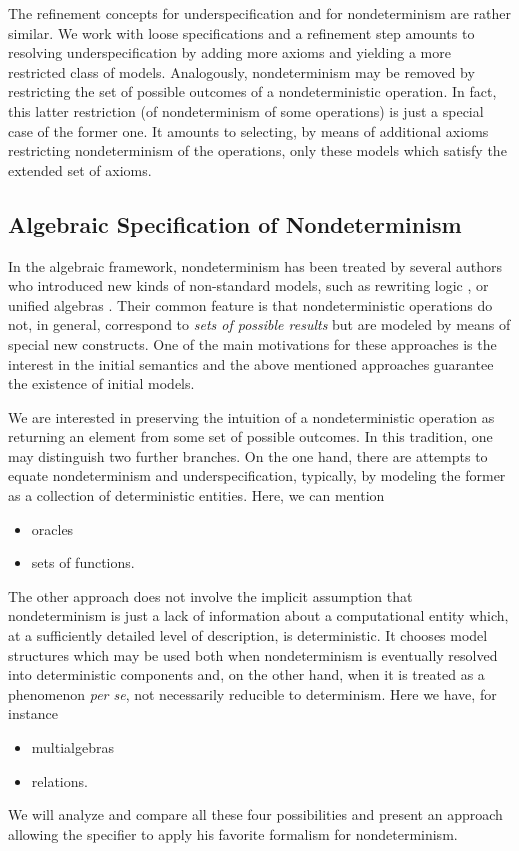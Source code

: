 The refinement concepts for underspecification and for nondeterminism are rather similar.
We work with loose specifications and a refinement step amounts to resolving underspecification
by adding more axioms and yielding a more restricted class of models. Analogously, nondeterminism may be removed by restricting the set of possible outcomes of a nondeterministic operation. In fact, this latter restriction (of nondeterminism of some operations) is just a special case of the former one. It amounts to selecting, by means of additional axioms restricting nondeterminism of the operations, only these models which satisfy the extended set of axioms. 

\subsection{Algebraic Specification of Nondeterminism} In the algebraic framework, nondeterminism has been treated by several authors
who introduced
new kinds of non-standard models, such as rewriting logic \cite{Mes}, or unified algebras \cite{Mos}. Their common feature is that nondeterministic operations do not, in general, correspond to {\em sets of possible results}
but are modeled by means of special new constructs. One of the main motivations for these approaches is the interest in the initial semantics and the above mentioned approaches guarantee the existence of initial models. 

We are interested in preserving the intuition of a nondeterministic operation as returning an element from some set of possible outcomes. In this tradition, one may distinguish
two further branches. On the one hand, there are attempts to equate nondeterminism and
underspecification, typically, by modeling the former as a collection of deterministic entities. Here, we can mention \begin{itemize}\MyLPar
\item oracles
\item sets of functions.
\end{itemize}
The other approach does not involve the implicit assumption that nondeterminism
is just a lack of information about a computational entity which, at a sufficiently detailed
level of description, is deterministic. It chooses model structures which may be used both when nondeterminism is eventually resolved into deterministic components and, on the other hand, when it is treated as a phenomenon {\em per
se}, not necessarily reducible to determinism. Here we have, for instance \begin{itemize}\MyLPar
\item multialgebras
\item relations.
\end{itemize}
We will analyze and compare all these four possibilities and present an approach allowing the specifier to apply his favorite formalism for nondeterminism.

